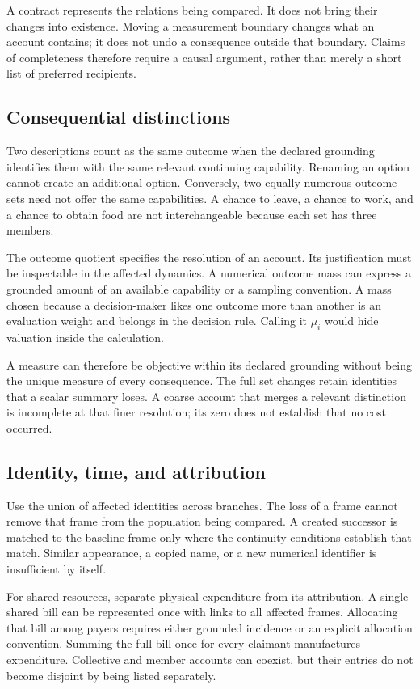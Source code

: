 \documentclass[11pt,a4paper]{article}
\theoremstyle{remark}
\begin{document}
A contract represents the relations being compared. It does not bring their
changes into existence. Moving a measurement boundary changes what an account
contains; it does not undo a consequence outside that boundary. Claims of
completeness therefore require a causal argument, rather than merely a short
list of preferred recipients.

\subsection{Consequential distinctions}

Two descriptions count as the same outcome when the declared grounding identifies
them with the same relevant continuing capability. Renaming an option cannot
create an additional option. Conversely, two equally numerous outcome sets need
not offer the same capabilities. A chance to leave, a chance to work, and a
chance to obtain food are not interchangeable because each set has three members.

The outcome quotient specifies the resolution of an account. Its justification
must be inspectable in the affected dynamics. A numerical outcome mass can express
a grounded amount of an available capability or a sampling convention. A mass
chosen because a decision-maker likes one outcome more than another is an
evaluation weight and belongs in the decision rule. Calling it $\mu_i$ would
hide valuation inside the calculation.

A measure can therefore be objective within its declared grounding without
being the unique measure of every consequence. The full set changes retain
identities that a scalar summary loses. A coarse account that merges a relevant
distinction is incomplete at that finer resolution; its zero does not establish
that no cost occurred.

\subsection{Identity, time, and attribution}

Use the union of affected identities across branches. The loss of a frame cannot
remove that frame from the population being compared. A created successor is
matched to the baseline frame only where the continuity conditions establish
that match. Similar appearance, a copied name, or a new numerical identifier
is insufficient by itself.

For shared resources, separate physical expenditure from its attribution. A
single shared bill can be represented once with links to all affected frames.
Allocating that bill among payers requires either grounded incidence or an
explicit allocation convention. Summing the full bill once for every claimant
manufactures expenditure. Collective and member accounts can coexist, but their
entries do not become disjoint by being listed separately.
\end{document}
